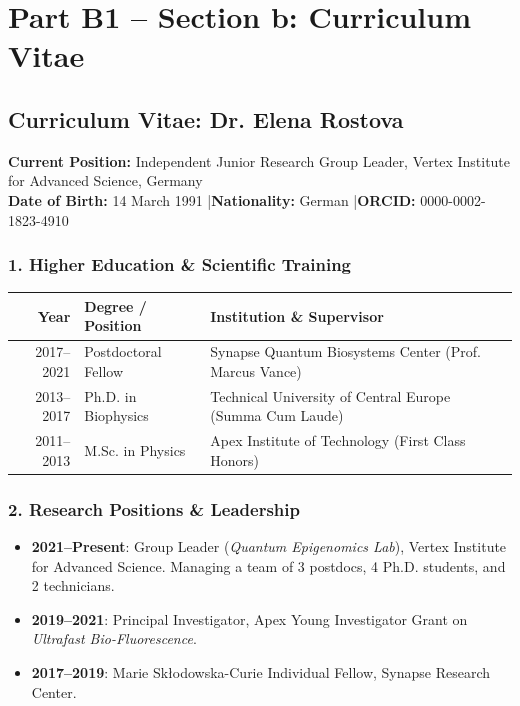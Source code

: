 \documentclass[11pt,a4paper]{article}
\begin{document}
\vspace{10pt}

\section*{Part B1 -- Section b: Curriculum Vitae}

\subsection*{Curriculum Vitae: Dr. Elena Rostova}
\noindent
\textbf{Current Position:} Independent Junior Research Group Leader, Vertex Institute for Advanced Science, Germany \\
\textbf{Date of Birth:} 14 March 1991 \quad |\quad \textbf{Nationality:} German \quad |\quad \textbf{ORCID:} 0000-0002-1823-4910

\subsubsection*{1. Higher Education \& Scientific Training}
\begin{tabularx}{\textwidth}{@{}r p{3.2cm} X@{}}
  \toprule
  \textbf{Year} & \textbf{Degree / Position} & \textbf{Institution \& Supervisor} \\
  \midrule
  2017--2021 & Postdoctoral Fellow & Synapse Quantum Biosystems Center (Prof. Marcus Vance) \\
  2013--2017 & Ph.D. in Biophysics & Technical University of Central Europe (Summa Cum Laude) \\
  2011--2013 & M.Sc. in Physics & Apex Institute of Technology (First Class Honors) \\
  \bottomrule
\end{tabularx}

\subsubsection*{2. Research Positions \& Leadership}
\begin{itemize}[leftmargin=1.5em, itemsep=2pt]
  \item \textbf{2021--Present}: Group Leader (\textit{Quantum Epigenomics Lab}), Vertex Institute for Advanced Science. Managing a team of 3 postdocs, 4 Ph.D. students, and 2 technicians.
  \item \textbf{2019--2021}: Principal Investigator, Apex Young Investigator Grant on \textit{Ultrafast Bio-Fluorescence}.
  \item \textbf{2017--2019}: Marie Sk\l odowska-Curie Individual Fellow, Synapse Research Center.
\end{itemize}
\end{document}
